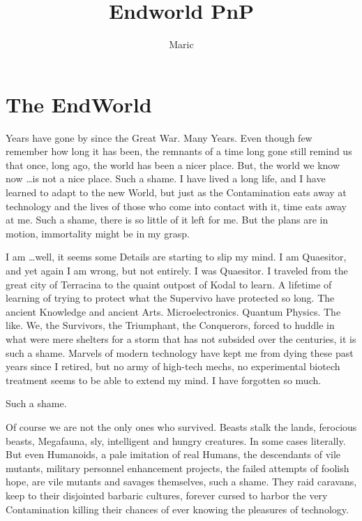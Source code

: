 \documentclass[a4paper]{book}
\title{Endworld PnP}
\author{Maric}
\date{}
\begin{document}
    \maketitle
    \tableofcontents
    \chapter{The EndWorld}\label{ch:theendworld}

    Years have gone by since the Great War.
    Many Years.
    Even though few remember how long it has been, the remnants of a time long gone still remind us that once,
    long ago, the world has been a nicer place.
    But, the world we know now \ldots is not a nice place.
    Such a shame.
    I have lived a long life, and I have learned to adapt to the new World,
    but just as the Contamination eats away at technology and the lives of those who come into contact with it, time
    eats away at me.
    Such a shame, there is so little of it left for me.
    But the plans are in motion, immortality might be in my grasp.\par
    I am \ldots well, it seems some Details are starting to slip my mind.
    I am Quaesitor, and yet again I am wrong, but not entirely.
    I was Quaesitor.
    I traveled from the great city of Terracina to the quaint outpost of Kodal to learn.
    A lifetime of learning of trying to protect what the Supervivo have protected so long.
    The ancient Knowledge and ancient Arts.
    Microelectronics.
    Quantum Physics.
    The like.
    We, the Survivors, the Triumphant, the Conquerors,
    forced to huddle in what were mere shelters for a storm that has not subsided over the centuries,
    it is such a shame.
    Marvels of modern technology have kept me from dying these past years since I retired,
    but no army of high-tech mechs, no experimental biotech treatment seems to be able to extend my mind.
    I have forgotten so much.
    \par Such a shame.\par
    Of course we are not the only ones who survived.
    Beasts stalk the lands, ferocious beasts, Megafauna, sly, intelligent and hungry creatures.
    In some cases literally.
    But even Humanoids, a pale imitation of real Humans, the descendants of vile mutants,
    military personnel enhancement projects, the failed attempts of foolish hope,
    are vile mutants and savages themselves, such a shame.
    They raid caravans, keep to their disjointed barbaric cultures,
    forever cursed to harbor the very Contamination killing their chances of ever knowing the pleasures of technology.
\end{document}
